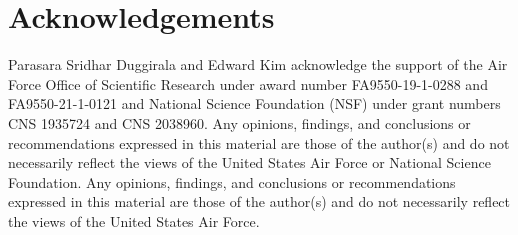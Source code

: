 \newpage
\section*{Acknowledgements}
Parasara Sridhar Duggirala and Edward Kim acknowledge the support of the Air Force Office of Scientific Research under award number FA9550-19-1-0288 and FA9550-21-1-0121 and National Science Foundation (NSF) under grant numbers CNS 1935724 and CNS 2038960. Any opinions, findings, and conclusions or recommendations expressed in this material are those of the author(s) and do not necessarily reflect the views of the United States Air Force or National Science Foundation. Any opinions, findings, and conclusions or recommendations expressed in this material are those of the author(s) and do not necessarily reflect the views of the United States Air Force.

